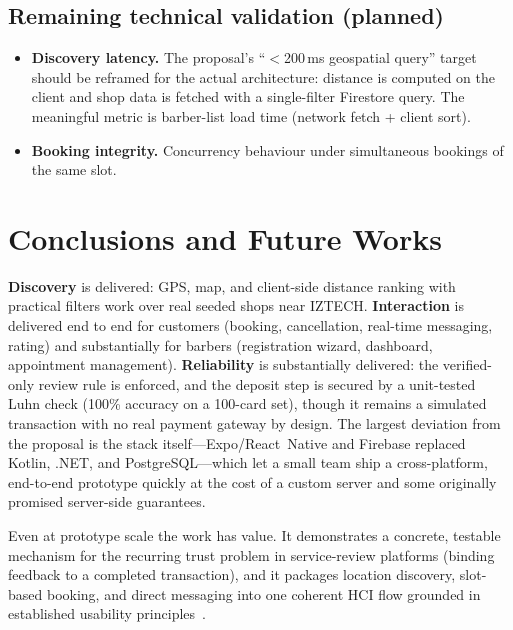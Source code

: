 \documentclass[14pt]{article}
\begin{document}
\subsection{Remaining technical validation (planned)}
\begin{itemize}
  \item \textbf{Discovery latency.} The proposal's ``$<$200\,ms
        geospatial query'' target should be reframed for the actual
        architecture: distance is computed on the client and shop data is
        fetched with a single-filter Firestore query. The meaningful
        metric is barber-list load time (network fetch + client sort).
  \item \textbf{Booking integrity.} Concurrency behaviour under
        simultaneous bookings of the same slot.
\end{itemize}

\section{Conclusions and Future Works}
\label{sec:concl}
\textbf{Discovery} is delivered: GPS, map, and client-side distance
ranking with practical filters work over real seeded shops near IZTECH.
\textbf{Interaction} is delivered end to end for customers (booking,
cancellation, real-time messaging, rating) and substantially for barbers
(registration wizard, dashboard, appointment management).
\textbf{Reliability} is substantially delivered: the verified-only
review rule is enforced, and the deposit step is secured by a
unit-tested Luhn check (100\% accuracy on a 100-card set), though it
remains a simulated transaction with no real payment gateway by design.
The largest deviation from the proposal is the stack
itself---Expo/React~Native and Firebase replaced Kotlin, .NET, and
PostgreSQL---which let a small team ship a cross-platform, end-to-end
prototype quickly at the cost of a custom server and some originally
promised server-side guarantees.

Even at prototype scale the work has value. It demonstrates a concrete,
testable mechanism for the recurring trust problem in service-review
platforms (binding feedback to a completed transaction), and it packages
location discovery, slot-based booking, and direct messaging into one
coherent HCI flow grounded in established usability
principles~\citep{shneiderman2016designing}.
\end{document}
